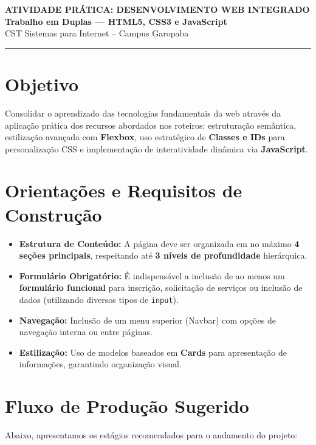 \documentclass[12pt,a4paper]{article}
\begin{document}
\begin{center}
    {\Large \textbf{ATIVIDADE PRÁTICA: DESENVOLVIMENTO WEB INTEGRADO}}\\
    \textbf{Trabalho em Duplas — HTML5, CSS3 e JavaScript}\\
    CST Sistemas para Internet -- Campus Garopaba
\end{center}

\vspace{0.5cm}
\hrule
\vspace{0.8cm}

\section{Objetivo}
Consolidar o aprendizado das tecnologias fundamentais da web através da aplicação prática dos recursos abordados nos roteiros: estruturação semântica, estilização avançada com \textbf{Flexbox}, uso estratégico de \textbf{Classes e IDs} para personalização CSS e implementação de interatividade dinâmica via \textbf{JavaScript}.

\section{Orientações e Requisitos de Construção}
\begin{itemize}
    \item \textbf{Estrutura de Conteúdo:} A página deve ser organizada em no máximo \textbf{4 seções principais}, respeitando até \textbf{3 níveis de profundidade} hierárquica.
    \item \textbf{Formulário Obrigatório:} É indispensável a inclusão de ao menos um \textbf{formulário funcional} para inscrição, solicitação de serviços ou inclusão de dados (utilizando diversos tipos de \texttt{input}).
    \item \textbf{Navegação:} Inclusão de um menu superior (Navbar) com opções de navegação interna ou entre páginas.
    \item \textbf{Estilização:} Uso de modelos baseados em \textbf{Cards} para apresentação de informações, garantindo organização visual.
\end{itemize}

\section{Fluxo de Produção Sugerido}
Abaixo, apresentamos os estágios recomendados para o andamento do projeto:
\end{document}
